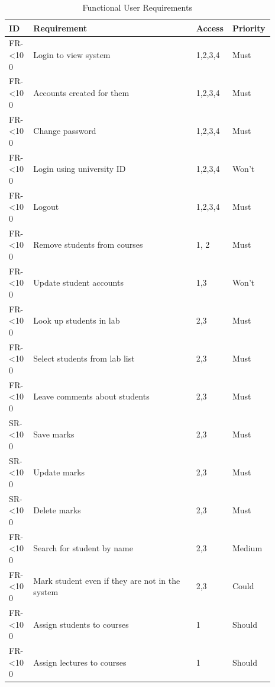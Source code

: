 \documentclass[12pt]{article}  %
\newcommand{\rid}[1]{\centering #1-\ifnum\value{requirement}<10 0\fi\arabic{requirement} \stepcounter{requirement}}
\begin{document}
\begin{spacing}{1.5}
\begin{longtable}{|p{0.09\linewidth}|p{0.6\linewidth}|p{0.1\linewidth}|
p{0.1\linewidth}|}
\caption{Functional User Requirements} \label{table:funct-user} \\ \hline
\textbf{ID} & \textbf{Requirement} & \textbf{Access} & \textbf{Priority}\\
\hline \hline

\rowcolor{Gray} \rid{FR} & Login to view system & 1,2,3,4 & Must\\ \hline
\rid{FR} &  Accounts created for them & 1,2,3,4 & Must\\ \hline
\rid{FR} &  Change password & 1,2,3,4 & Must\\ \hline
\rid{FR} &  Login using university ID & 1,2,3,4 & Won't\\ \hline
\rid{FR} &  Logout & 1,2,3,4 & Must \\ \hline

\rid{FR} &  Remove students from courses & 1, 2 & Must\\ \hline
\rid{FR} &  Update student accounts & 1,3 & Won't \\ \hline

\rid{FR} &  Look up students in lab & 2,3 & Must\\ \hline
\rid{FR} &  Select students from lab list & 2,3 & Must\\ \hline
\rid{FR} &  Leave comments about students & 2,3 & Must\\ \hline
\rid{SR} &  Save marks & 2,3 & Must\\ \hline
\rid{SR} &  Update marks & 2,3 & Must\\ \hline
\rid{SR} &  Delete marks & 2,3 & Must\\ \hline
\rid{FR} &  Search for student by name & 2,3 & Medium\\ \hline
\rid{FR} &  Mark student even if they are not in the system & 2,3 & Could \\ \hline

\rid{FR} &  Assign students to courses & 1 & Should\\ \hline
\rid{FR} &  Assign lectures to courses & 1 & Should\\ \hline


\end{longtable}
\end{spacing}
\end{document}
